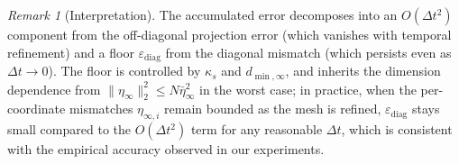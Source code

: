 \documentclass{article}
\theoremstyle{plain}
\theoremstyle{definition}
\theoremstyle{remark}
\newtheorem{remark}[theorem]{Remark}
\newcommand{\norm}[1]{\lVert #1 \rVert}
\begin{document}
\begin{remark}[Interpretation]
The accumulated error decomposes into an $O(\Delta t^2)$ component from the off-diagonal projection error (which vanishes with temporal refinement) and a floor $\varepsilon_{\mathrm{diag}}$ from the diagonal mismatch (which persists even as $\Delta t \to 0$). The floor is controlled by $\kappa_s$ and $d_{\min,\infty}$, and inherits the dimension dependence from $\norm{\eta_\infty}_2^2 \leq N \bar{\eta}_\infty^2$ in the worst case; in practice, when the per-coordinate mismatches $\eta_{\infty,i}$ remain bounded as the mesh is refined, $\varepsilon_{\mathrm{diag}}$ stays small compared to the $O(\Delta t^2)$ term for any reasonable $\Delta t$, which is consistent with the empirical accuracy observed in our experiments.
\end{remark}
\end{document}
